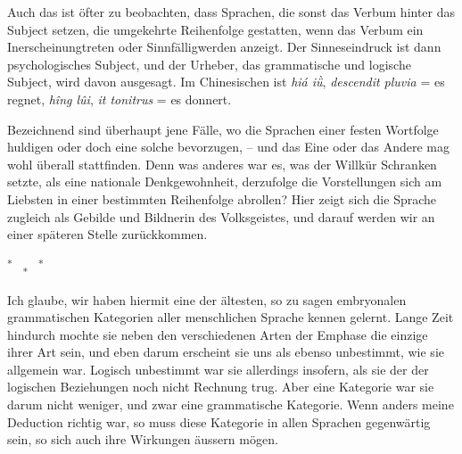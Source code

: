Auch das ist öfter zu beobachten, dass Sprachen, die sonst das Verbum hinter das Subject setzen, die umgekehrte Reihenfolge gestatten, wenn das Verbum ein Inerscheinungtreten oder Sinnfälligwerden anzeigt. Der Sinneseindruck ist dann psychologisches Subject, und der Urheber, das grammatische und logische Subject, wird davon ausgesagt. Im Chinesischen ist \textit{hiá iǜ}, \textit{descendit pluvia} = es regnet, \textit{hîng lûi}, \textit{it tonitrus} = es donnert. 

Bezeichnend sind überhaupt jene Fälle, wo die Sprachen einer festen Wortfolge huldigen oder doch eine solche bevorzugen, – und das Eine oder das Andere mag wohl überall stattfinden. Denn was anderes war es, was der Willkür Schranken setzte, als eine nationale Denkgewohnheit, derzufolge die Vorstellungen sich am Liebsten in einer bestimmten Reihenfolge abrollen? Hier zeigt sich die Sprache zugleich als Gebilde und Bildnerin des Volksgeistes, und darauf werden wir an einer späteren Stelle zurückkommen.

\begin{center}
\textsuperscript{* }\ \textsubscript{*} \ \textsuperscript{*}
\end{center}

Ich glaube, wir haben hiermit eine der ältesten, so zu sagen embryonalen grammatischen Kategorien aller menschlichen Sprache kennen gelernt. Lange Zeit hindurch mochte sie neben den verschiedenen Arten der Emphase die einzige ihrer Art sein, und eben darum erscheint sie uns als ebenso unbestimmt, wie sie allgemein war. Logisch unbestimmt war sie allerdings insofern, als sie der  der logischen Beziehungen noch nicht Rechnung trug. Aber eine Kategorie war sie darum nicht weniger, und zwar eine grammatische Kategorie. Wenn anders meine Deduction richtig war, so muss diese Kategorie in allen Sprachen gegenwärtig sein, so  sich auch ihre Wirkungen äussern mögen.

